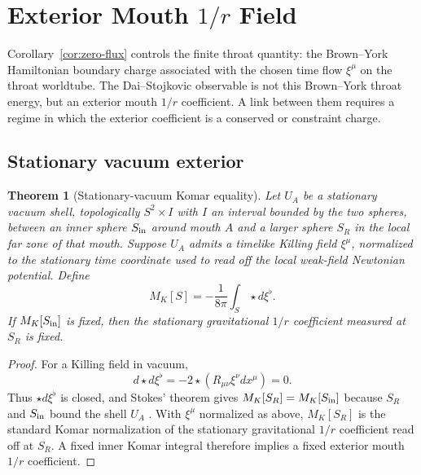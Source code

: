\documentclass[aps,prd,10pt,onecolumn,nofootinbib,superscriptaddress,floatfix]{revtex4-2}
\newtheorem{theorem}{Theorem}
\begin{document}
\section{Exterior Mouth \texorpdfstring{$1/r$}{1/r} Field}
\label{sec:mouth-bridge}

Corollary~\ref{cor:zero-flux} controls the finite throat quantity: the
Brown--York Hamiltonian boundary charge associated with the chosen time flow
$\xi^\mu$ on the throat worldtube.  The Dai--Stojkovic observable is not this
Brown--York throat energy, but an exterior mouth $1/r$ coefficient.  A link
between them requires a regime in which the exterior coefficient is a conserved
or constraint charge.

\subsection{Stationary vacuum exterior}

\begin{theorem}[Stationary-vacuum Komar equality]
\label{thm:komar-propagation}
Let $U_A$ be a stationary vacuum shell, topologically $S^2\times I$ with $I$
an interval bounded by the two spheres, between an inner sphere $S_{\rm in}$
around mouth $A$ and a larger sphere $S_R$ in the local far zone of that
mouth.  Suppose $U_A$ admits a timelike Killing field
$\xi^\mu$, normalized to the stationary time coordinate used to read off the
local weak-field Newtonian potential.  Define
\begin{equation}
  M_K[S]=-\frac{1}{8\pi}\int_S\star d\xi^\flat .
\end{equation}
If $M_K[S_{\rm in}]$ is fixed, then the stationary gravitational $1/r$
coefficient measured at $S_R$ is fixed.
\end{theorem}

\begin{proof}
For a Killing field in vacuum,
\begin{equation}
  d\star d\xi^\flat=-2\star(R_{\mu\nu}\xi^\nu dx^\mu)=0 .
\end{equation}
Thus $\star d\xi^\flat$ is closed, and Stokes' theorem gives
$M_K[S_R]=M_K[S_{\rm in}]$ because $S_R$ and $S_{\rm in}$ bound the shell $U_A$
\cite{Komar1959Covariant}.  With $\xi^\mu$ normalized as above, $M_K[S_R]$ is
the standard Komar normalization of the stationary gravitational $1/r$
coefficient read off at $S_R$.  A fixed inner Komar integral therefore implies
a fixed exterior mouth $1/r$ coefficient.
\end{proof}
\end{document}
